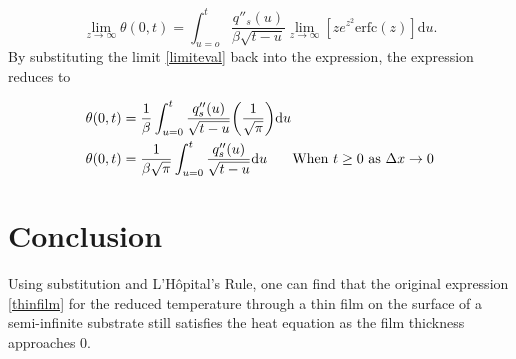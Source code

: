 \documentclass{article}
\begin{document}
\begin{equation}
    \lim_{z\rightarrow\infty} \theta(0,t) = \int_{u=o}^t \frac{q''_s(u)}{\beta\sqrt{t-u}} \lim_{z\rightarrow\infty}[ ze^{z^2} \text{erfc}(z)]\text{d}u.
\end{equation}
By substituting the limit \eqref{limiteval} back into the expression, the expression reduces to

\begin{align}
    \theta(0,t) &= \frac{1}{\beta}\int_{u=0}^t \frac{q''_s(u)}{\sqrt{t-u}}\bigg(\frac{1}{\sqrt{\pi}}\bigg)\text{d}u \\
     \theta(0,t) &= \frac{1}{\beta\sqrt{\pi}}\int_{u=0}^t\frac{q''_s(u)}{\sqrt{t-u}}\text{d}u \hspace{0.25in} \text{When } t  \geq 0 \text{ as } \Delta x \rightarrow 0
\end{align}


\section{Conclusion}

Using substitution and L'Hôpital's Rule, one can find that the original expression \eqref{thinfilm} for the reduced temperature through a thin film on the surface of a semi-infinite substrate still satisfies the heat equation as the film thickness approaches 0.
\end{document}
